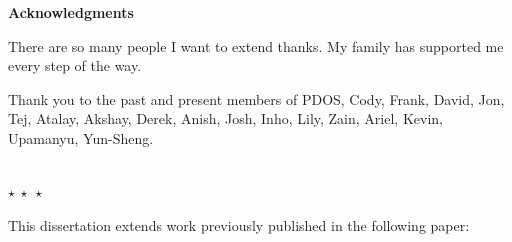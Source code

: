 
{\noindent \huge \bf Acknowledgments\\}

There are so many people I want to extend thanks.
My family has supported me every step of the way.

Thank you to the past and present members of PDOS, Cody, Frank, David, Jon, Tej, Atalay, Akshay, Derek, Anish, Josh, Inho, Lily, Zain, Ariel, Kevin, Upamanyu, Yun-Sheng.


\begin{center}
    ~\\[\baselineskip]
    $\star~\star~\star$
    ~\\[\baselineskip]
\end{center}


\noindent
This dissertation extends work previously published in the following paper:

